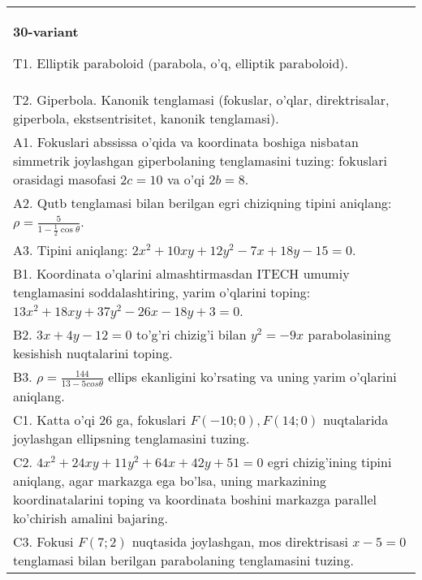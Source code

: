 \documentclass{article}
\begin{document}
\begin{tabular}{m{17cm}}
\textbf{30-variant}
\newline

T1. Elliptik paraboloid (parabola, o'q, elliptik paraboloid).\\

T2. Giperbola. Kanonik tenglamasi (fokuslar, o'qlar, direktrisalar, giperbola, ekstsentrisitet, kanonik tenglamasi).\\

A1. Fokuslari abssissa o'qida va koordinata boshiga nisbatan simmetrik joylashgan giperbolaning tenglamasini tuzing: fokuslari orasidagi masofasi $2c=10$ va o'qi $2b=8$.\\

A2. Qutb tenglamasi bilan berilgan egri chiziqning tipini aniqlang: $\rho=\frac{5}{1-\frac{1}{2}\cos\theta}$.\\

A3. Tipini aniqlang: $2x^{2}+10xy+12y^{2}-7x+18y-15=0$.\\

B1. Koordinata o'qlarini almashtirmasdan ITECH umumiy tenglamasini soddalashtiring, yarim o'qlarini toping: $13x^{2} + 18xy + 37y^{2} - 26x - 18y + 3 = 0$.  \\

B2. $3x + 4y - 12 = 0$ to'g'ri chizig'i bilan $y^{2} = - 9x$ parabolasining kesishish nuqtalarini toping.  \\

B3. $\rho = \frac{144}{13 - 5cos\theta}$ ellips ekanligini ko'rsating va uning yarim o'qlarini aniqlang.\\

C1. Katta o'qi 26 ga, fokuslari $F( - 10;0), F(14;0)$ nuqtalarida joylashgan ellipsning tenglamasini tuzing.  \\

C2. $4x^{2} + 24xy + 11y^{2} + 64x + 42y + 51 = 0$ egri chizig'ining tipini aniqlang, agar markazga ega bo'lsa, uning markazining koordinatalarini toping va koordinata boshini markazga parallel ko'chirish amalini bajaring.\\

C3. Fokusi $F(7;2)$ nuqtasida joylashgan, mos direktrisasi $x - 5 = 0$ tenglamasi bilan berilgan parabolaning tenglamasini tuzing.  \\

\end{tabular}
\vspace{1cm}
\end{document}
